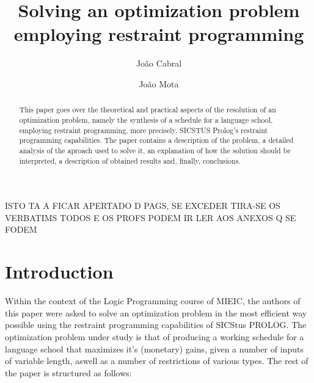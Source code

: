 \documentclass{llncs}
\begin{document}
\tableofcontents
%
%
\title{Solving an optimization problem employing restraint programming}
%
%
\author{João Cabral \and João Mota}
%
%
%

\maketitle              %

\begin{abstract}
This paper goes over the theoretical and practical aspects of the resolution of an optimization problem,
namely the synthesis of a schedule for a language school, employing restraint programming, more precisely, 
SICSTUS Prolog's restraint programming capabilities.
The paper contains a description of the problem, a detailed analysis of the aproach used to solve it, 
an explanation of how the solution should be interpreted, a description of obtained results and, finally, conclusions.

\end{abstract}
%
ISTO TA A FICAR APERTADO D PAGS, SE EXCEDER TIRA-SE OS VERBATIMS TODOS E OS PROFS PODEM IR LER AOS ANEXOS Q SE FODEM
\section{Introduction}
Within the context of the Logic Programming course of MIEIC, the authors of this paper were asked to solve an optimization problem in the most efficient way possible using the restraint programming capabilities of SICStus PROLOG. The optimization problem under study is that of producing a working schedule for a language school that maximizes it's (monetary) gains,  given a number of inputs of variable length, aswell as a number of restrictions of various types. The rest of the paper is structured as follows:
\end{document}
